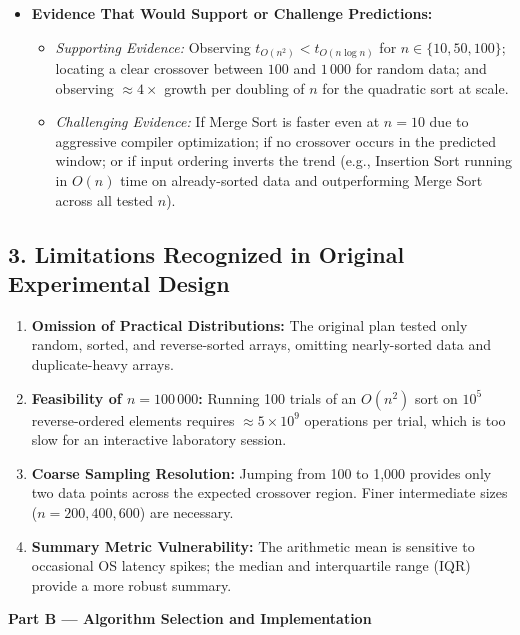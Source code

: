 \documentclass[11pt]{article}
\begin{document}
\begin{itemize}
    \item \textbf{Evidence That Would Support or Challenge Predictions:}
    \begin{itemize}
        \item \textit{Supporting Evidence:} Observing $t_{O(n^2)} < t_{O(n \log n)}$ for $n \in \{10, 50, 100\}$; locating a clear crossover between $100$ and $1\,000$ for random data; and observing $\approx 4\times$ growth per doubling of $n$ for the quadratic sort at scale.
        \item \textit{Challenging Evidence:} If Merge Sort is faster even at $n = 10$ due to aggressive compiler optimization; if no crossover occurs in the predicted window; or if input ordering inverts the trend (e.g., Insertion Sort running in $O(n)$ time on already-sorted data and outperforming Merge Sort across all tested $n$).
    \end{itemize}
\end{itemize}

\subsection*{3. Limitations Recognized in Original Experimental Design}
\begin{enumerate}
    \item \textbf{Omission of Practical Distributions:} The original plan tested only random, sorted, and reverse-sorted arrays, omitting nearly-sorted data and duplicate-heavy arrays.
    \item \textbf{Feasibility of $n = 100\,000$:} Running 100 trials of an $O(n^2)$ sort on $10^5$ reverse-ordered elements requires $\approx 5 \times 10^9$ operations per trial, which is too slow for an interactive laboratory session.
    \item \textbf{Coarse Sampling Resolution:} Jumping from 100 to 1,000 provides only two data points across the expected crossover region. Finer intermediate sizes ($n = 200, 400, 600$) are necessary.
    \item \textbf{Summary Metric Vulnerability:} The arithmetic mean is sensitive to occasional OS latency spikes; the median and interquartile range (IQR) provide a more robust summary.
\end{enumerate}

\newpage

{\centering\fontsize{15}{18}\selectfont\textbf{Part B --- Algorithm Selection and Implementation}\par}
\vspace{0.8em}
\end{document}
